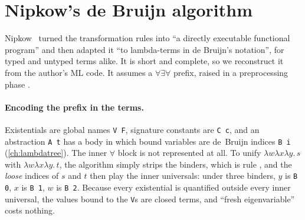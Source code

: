 \section{Nipkow's de Bruijn algorithm}\label{sec:hounif-nipkow}

Nipkow~\cite{Nipkow1993} turned the transformation rules into \enquote{a directly executable functional program}
and then adapted it \enquote{to lambda-terms in de Bruijn's notation}, for typed and untyped terms alike. It is short and
complete, so we reconstruct it from the author's ML code.
It assumes a $\forall\exists\forall$ prefix, raised in a preprocessing phase .

\paragraph{Encoding the prefix in the terms.} Existentials are global names \texttt{V F}, signature constants are
\texttt{C c}, and an abstraction \texttt{A t} has a body in which bound variables are de~Bruijn indices \texttt{B i}
(\cref{ch:lambdatree}). The inner $\forall$ block is not represented at all. To unify $\lambda w\lambda x\lambda y.\,s$ with
$\lambda w\lambda x\lambda y.\,t$, the algorithm simply strips the binders, which is rule , and the
\emph{loose} indices of $s$ and $t$ then play the inner universals: under three binders, $y$ is \texttt{B 0}, $x$
is \texttt{B 1}, $w$ is \texttt{B 2}. Because every existential is quantified outside every inner universal, the
values bound to the \texttt{V}s are closed terms, and \enquote{fresh eigenvariable} costs nothing.

